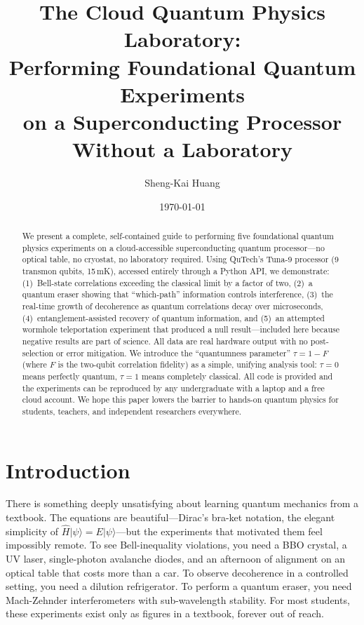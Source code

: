 \documentclass[amsmath,amssymb,reprint,aps,prb]{revtex4-2}
\newcommand{\ket}[1]{|#1\rangle}
\begin{document}
\title{The Cloud Quantum Physics Laboratory:\\
Performing Foundational Quantum Experiments\\
on a Superconducting Processor Without a Laboratory}

\author{Sheng-Kai Huang}

\date{\today}

\begin{abstract}
We present a complete, self-contained guide to performing five
foundational quantum physics experiments on a cloud-accessible
superconducting quantum processor---no optical table, no cryostat,
no laboratory required.  Using QuTech's Tuna-9 processor (9 transmon
qubits, 15\,mK), accessed entirely through a Python API, we
demonstrate: (1)~Bell-state correlations exceeding the classical
limit by a factor of two, (2)~a quantum eraser showing that
``which-path'' information controls interference, (3)~the real-time
growth of decoherence as quantum correlations decay over microseconds,
(4)~entanglement-assisted recovery of quantum information, and
(5)~an attempted wormhole teleportation experiment that produced a
null result---included here because negative results are part of
science.  All data are real hardware output with no post-selection
or error mitigation.  We introduce the ``quantumness parameter''
$\tau = 1 - F$ (where $F$ is the two-qubit correlation fidelity)
as a simple, unifying analysis tool: $\tau = 0$ means perfectly
quantum, $\tau = 1$ means completely classical.  All code is
provided and the experiments can be reproduced by any undergraduate
with a laptop and a free cloud account.  We hope this paper
lowers the barrier to hands-on quantum physics for students,
teachers, and independent researchers everywhere.
\end{abstract}

\maketitle

\section{Introduction}
\label{sec:intro}

There is something deeply unsatisfying about learning quantum
mechanics from a textbook.  The equations are beautiful---Dirac's
bra-ket notation, the elegant simplicity of $\hat{H}\ket{\psi} =
E\ket{\psi}$---but the experiments that motivated them feel
impossibly remote.  To see Bell-inequality violations, you need a
BBO crystal, a UV laser, single-photon avalanche diodes, and an
afternoon of alignment on an optical table that costs more than a
car.  To observe decoherence in a controlled setting, you need a
dilution refrigerator.  To perform a quantum eraser, you need
Mach-Zehnder interferometers with sub-wavelength stability.  For
most students, these experiments exist only as figures in a
textbook, forever out of reach.
\end{document}

